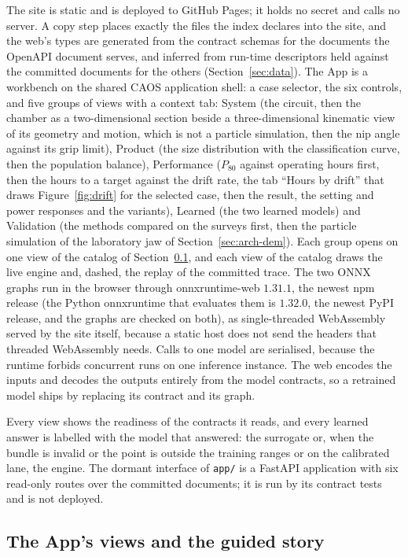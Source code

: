 The site is static and is deployed to GitHub Pages; it holds no secret and calls no server. A copy step places exactly the files the
index declares into the site, and the web's types are generated from the contract schemas for the documents the OpenAPI document serves, and inferred from
run-time descriptors held against the committed documents for the others (Section~\ref{sec:data}). The App is a workbench on the shared
CAOS application shell: a case selector, the six controls, and five groups of views with a context tab: System (the circuit, then the
chamber as a two-dimensional section beside a three-dimensional kinematic view of its geometry and motion, which is not a particle
simulation, then the nip angle against its grip limit), Product (the size distribution with the classification curve, then the
population balance), Performance ($P_{80}$ against operating hours first, then the hours to a target against the drift rate, the
tab ``Hours by drift'' that draws Figure~\ref{fig:drift} for the selected case, then the result, the setting
and power responses and the variants), Learned (the two learned models) and Validation (the methods compared on the
surveys first, then the particle simulation of the laboratory jaw of Section~\ref{sec:arch-dem}). Each group opens on one view
of the catalog of Section~\ref{sec:arch-showcase}, and each view of the catalog draws the live engine
and, dashed, the replay of the committed trace. The two ONNX graphs run in
the browser through onnxruntime-web $1.31.1$, the newest npm release (the Python onnxruntime that evaluates them is $1.32.0$, the newest PyPI release, and the graphs are checked on both), as single-threaded
WebAssembly served by the site itself, because a static host does not send the headers that threaded WebAssembly needs. Calls to one
model are serialised, because the runtime forbids concurrent runs on one inference instance. The web encodes the inputs and decodes the outputs
entirely from the model contracts, so a retrained model ships by replacing its contract and its graph.

Every view shows the readiness of the contracts it reads, and every learned answer is labelled with the model that answered: the
surrogate or, when the bundle is invalid or the point is outside the training ranges or on the calibrated lane, the engine. The
dormant interface of \texttt{app/\allowbreak{}} is a FastAPI application with six read-only routes over the committed documents; it is run by its
contract tests and is not deployed.

\subsection{The App's views and the guided story}\label{sec:arch-showcase}

